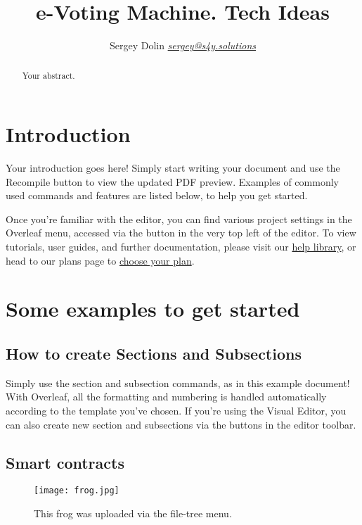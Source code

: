 \documentclass{article}
\title{e-Voting Machine. Tech Ideas}
\author{Sergey Dolin \href{mailto: sergey@s4y.solutions}{\textit{sergey@s4y.solutions}}}
\begin{document}
    \maketitle

    \begin{abstract}
        Your abstract.
    \end{abstract}

    \section{Introduction}

    Your introduction goes here! Simply start writing your document and use the Recompile button to view the updated PDF preview. Examples of commonly used commands and features are listed below, to help you get started.

    Once you're familiar with the editor, you can find various project settings in the Overleaf menu, accessed via the button in the very top left of the editor. To view tutorials, user guides, and further documentation, please visit our \href{https://www.overleaf.com/learn}{help library}, or head to our plans page to \href{https://www.overleaf.com/user/subscription/plans}{choose your plan}.

    \section{Some examples to get started}

    \subsection{How to create Sections and Subsections}

    Simply use the section and subsection commands, as in this example document! With Overleaf, all the formatting and numbering is handled automatically according to the template you've chosen. If you're using the Visual Editor, you can also create new section and subsections via the buttons in the editor toolbar.

    \subsection{Smart contracts}\label{subsec:smart-contracts}


    \begin{figure}
        \centering
        \texttt{[image: frog.jpg]}
        \caption{\label{fig:frog}This frog was uploaded via the file-tree menu.}
    \end{figure}
\end{document}
